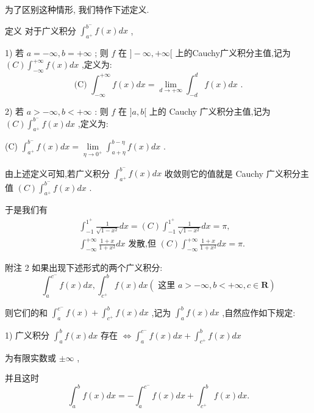 为了区别这种情形, 我们特作下述定义.

定义 对于广义积分 ${\int }_{{a}^{ + }}^{{b}^{ - }}f\left( x\right) {dx}$ ,

1) 若 $a =  - \infty ,b =  + \infty$ ; 则 $f$ 在 $\rbrack  - \infty , + \infty \lbrack$ 上的Cauchy广义积分主值,记为 $\left( C\right) {\int }_{-\infty }^{+\infty }f\left( x\right) {dx}$ ,定义为:
$$\text{ (C) }{\int }_{-\infty }^{+\infty }f\left( x\right) {dx} = \mathop{\lim }\limits_{{d \rightarrow   + \infty }}{\int }_{-d}^{d}f\left( x\right) {dx}\text{ . }$$

2) 若 $a >  - \infty ,b <  + \infty$ : 则 $f$ 在 $\rbrack a,b\lbrack$ 上的 Cauchy 广义积分主值,记为 $\left( C\right) {\int }_{{a}^{ + }}^{{b}^{ - }}f\left( x\right) {dx}$ ,定义为:

(C) ${\int }_{{a}^{ + }}^{{b}^{ - }}f\left( x\right) {dx} = \mathop{\lim }\limits_{{\eta  \rightarrow  {0}^{ + }}}{\int }_{a + \eta }^{b - \eta }f\left( x\right) {dx}$ .

由上述定义可知,若广义积分 ${\int }_{{a}^{ + }}^{{b}^{ - }}f\left( x\right) {dx}$ 收敛则它的值就是 Cauchy 广义积分主值 $\left( C\right) {\int }_{{a}^{ + }}^{{b}^{ - }}f\left( x\right) {dx}$ .

于是我们有
\begin{align*}
	&{\int }_{-1}^{{1}^{ + }}\frac{1}{\sqrt{1 - {x}^{2}}}{dx} = \left( C\right) {\int }_{-1}^{{1}^{ + }}\frac{1}{\sqrt{1 - {x}^{2}}}{dx} = \pi ,\\
	&{\int }_{-\infty }^{+\infty }\frac{1 + x}{1 + {x}^{2}}{dx}\text{ 发散,但 }\left( C\right) {\int }_{-\infty }^{+\infty }\frac{1 + x}{1 + {x}^{2}}{dx} = \pi .
\end{align*}

附注 2 如果出现下述形式的两个广义积分:
$${\int }_{a}^{{c}^{ - }}f\left( x\right) {dx},{\int }_{{c}^{ + }}^{b}f\left( x\right) {dx}\left( {\text{ 这里 }a >  - \infty ,b <  + \infty ,c \in  \mathbf{R}}\right)$$

则它们的和 ${\int }_{a}^{{c}^{ - }}f\left( x\right)  + {\int }_{{c}^{ + }}^{b}f\left( x\right) {dx}$ ,记为 ${\int }_{a}^{b}f\left( x\right) {dx}$ ,自然应作如下规定:

1) 广义积分 ${\int }_{a}^{b}f\left( x\right) {dx}$ 存在 $\Leftrightarrow  {\int }_{a}^{{c}^{ - }}f\left( x\right) {dx} + {\int }_{{c}^{ + }}^{b}f\left( x\right) {dx}$

为有限实数或 $\pm  \infty$ ,

并且这时
$${\int }_{a}^{b}f\left( x\right) {dx} =  - {\int }_{a}^{{c}^{ - }}f\left( x\right) {dx} + {\int }_{{c}^{ + }}^{b}f\left( x\right) {dx}.$$

